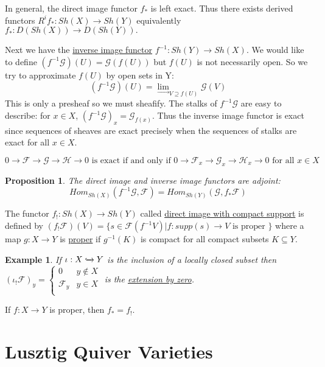 \documentclass{book}
\newtheorem{prop}[theorem]{Proposition}
\newtheorem{example}{Example}[section]
\begin{document}
In general, the direct image functor $f_*$ is left exact. Thus there exists derived functors $R^if_* : Sh(X) \rightarrow Sh(Y)$ equivalently $f_*:D(Sh(X)) \rightarrow D(Sh(Y)).$ 

Next we have the \underline{inverse image functor} $f^{-1} : Sh(Y) \rightarrow Sh(X)$.  We would like to define $(f^{-1} \mathcal{G})(U)=\mathcal{G} (f(U))$ but $f(U)$ is not necessarily open. So we try to approximate $f(U)$ by open sets in Y:
$$ (f^{-1} \mathcal{G} )(U) = \displaystyle{ \lim_{\rightarrow}}_{V \supseteq f(U)} \mathcal{G}(V)$$
This is only a presheaf so we must sheafify. The stalks of $f^{-1}\mathcal{G}$ are easy to describe: for $x\in X$, $(f^{-1}\mathcal{G})_x = \mathcal{G}_{f(x)}$. Thus the inverse image functor is exact since sequences of sheaves are exact precisely when the sequences of stalks are exact for all $x\in X$.

$$0\rightarrow \mathcal{F} \rightarrow \mathcal{G}\rightarrow \mathcal{H} \rightarrow 0 \text{ is exact if and only if } 0\rightarrow \mathcal{F}_x \rightarrow \mathcal{G}_x\rightarrow \mathcal{H}_x \rightarrow 0 \text{ for all } x\in X$$ 

\begin{prop}
The direct image and inverse image functors are adjoint:
$$ Hom_{Sh(X)}(f^{-1}\mathcal{G}, \mathcal{F})=Hom_{Sh(Y)}(\mathcal{G}, f_*\mathcal{F})$$
\end{prop}

The functor $f_{!} : Sh(X) \to Sh(Y) $ called \underline{direct image with compact support} is defined by $(f_!\mathcal{F})(V)=\{ s \in \mathcal{F}(f^{-1}V) | f:supp(s) \to V \text{ is proper }\}$ where a map $g:X\to Y$ is \underline{proper} if $g^{-1}(K)$ is compact for all compact subsets $K\subseteq Y$. 

\begin{example}
If $\iota : X \xhookrightarrow{} Y$ is the inclusion of a locally closed subset then $ (\iota_! \mathcal{F})_y = \left\{
\begin{array}{ll}
      0 & y \notin X \\
      \mathcal{F}_y & y\in X \\
\end{array} 
\right.$ is the \underline{extension by zero}. 
\end{example}

If $f:X\rightarrow Y$ is proper, then $f_*=f_!$.

  \section{Lusztig Quiver Varieties}
\end{document}

